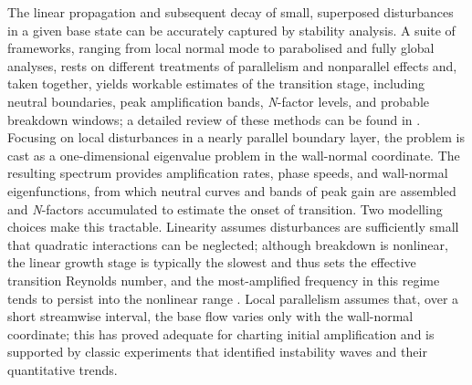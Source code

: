 The linear propagation and subsequent decay of small, superposed disturbances in a given base state can be accurately captured by stability analysis. A suite of frameworks, ranging from local normal mode to parabolised and fully global analyses, rests on different treatments of parallelism and nonparallel effects and, taken together, yields workable estimates of the transition stage, including neutral boundaries, peak amplification bands, \textit{N}-factor levels, and probable breakdown windows; a detailed review of these methods can be found in \citep{Theofilis2011}. Focusing on local disturbances in a nearly parallel boundary layer, the problem is cast as a one-dimensional eigenvalue problem in the wall-normal coordinate. The resulting spectrum provides amplification rates, phase speeds, and wall-normal eigenfunctions, from which neutral curves and bands of peak gain are assembled and \textit{N}-factors accumulated to estimate the onset of transition. Two modelling choices make this tractable. Linearity assumes disturbances are sufficiently small that quadratic interactions can be neglected; although breakdown is nonlinear, the linear growth stage is typically the slowest and thus sets the effective transition Reynolds number, and the most-amplified frequency in this regime tends to persist into the nonlinear range \citep{Reshotko2001,Mack1984}. Local parallelism assumes that, over a short streamwise interval, the base flow varies only with the wall-normal coordinate; this has proved adequate for charting initial amplification and is supported by classic experiments that identified instability waves and their quantitative trends.


